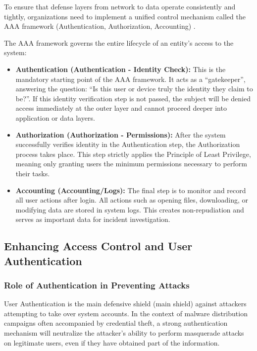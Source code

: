 To ensure that defense layers from network to data operate consistently and tightly, organizations need to implement a unified control mechanism called the AAA framework (Authentication, Authorization, Accounting) \cite{ref2}.

The AAA framework governs the entire lifecycle of an entity’s access to the system:

\begin{itemize}
    \item \textbf{Authentication (Authentication - Identity Check):} This is the mandatory starting point of the AAA framework. It acts as a ``gatekeeper'', answering the question: ``Is this user or device truly the identity they claim to be?''. If this identity verification step is not passed, the subject will be denied access immediately at the outer layer and cannot proceed deeper into application or data layers.
    
    \item \textbf{Authorization (Authorization - Permissions):} After the system successfully verifies identity in the Authentication step, the Authorization process takes place. This step strictly applies the Principle of Least Privilege, meaning only granting users the minimum permissions necessary to perform their tasks.
    
    \item \textbf{Accounting (Accounting/Logs):} The final step is to monitor and record all user actions after login. All actions such as opening files, downloading, or modifying data are stored in system logs. This creates non-repudiation and serves as important data for incident investigation.
\end{itemize}

\subsection{Enhancing Access Control and User Authentication}

\subsubsection{Role of Authentication in Preventing Attacks}

User Authentication is the main defensive shield (main shield) against attackers attempting to take over system accounts. In the context of malware distribution campaigns often accompanied by credential theft, a strong authentication mechanism will neutralize the attacker’s ability to perform masquerade attacks on legitimate users, even if they have obtained part of the information.

